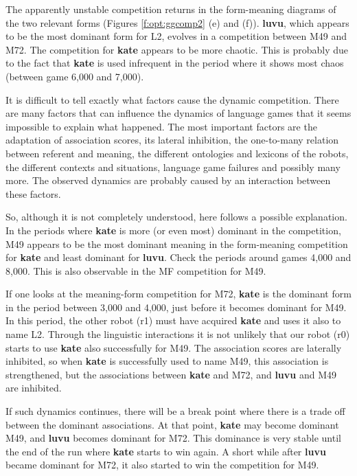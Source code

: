 The apparently unstable competition returns in the form-meaning diagrams of the two relevant forms (Figures \ref{f:opt:ggcomp2} (e) and (f)). {\bf luvu}, which appears to be the most dominant form for L2, evolves in a competition between M49 and M72. The competition for {\bf kate} appears to be more chaotic. This is probably due to the fact that {\bf kate} is used infrequent in the period where it shows most chaos (between game 6,000 and 7,000).

It is difficult to tell exactly what factors cause the dynamic competition. There are many factors that can influence the dynamics of language games that it seems impossible to explain what happened. The most important factors are the adaptation of association scores, its lateral inhibition, the one-to-many relation between referent and meaning, the different ontologies and lexicons of the robots, the different contexts and situations, language game failures and possibly many more. The observed dynamics are probably caused by an interaction between these factors.


So, although it is not completely understood, here follows a possible explanation. In the periods where {\bf kate} is more (or even most) dominant in the competition, M49 appears to be the most dominant meaning in the form-meaning competition for {\bf kate} and least dominant for {\bf luvu}. Check the periods around games 4,000 and 8,000. This is also observable in the MF competition for M49.

If one looks at the meaning-form competition for M72, {\bf kate} is the dominant form in the period between 3,000 and 4,000, just before it becomes dominant for M49. In this period, the other robot (r1) must have acquired {\bf kate} and uses it also to name L2. Through the linguistic interactions it is not unlikely that our robot (r0) starts to use {\bf kate} also successfully for M49. The association scores are laterally inhibited, so when {\bf kate} is successfully used to name M49, this association is strengthened, but the associations between {\bf kate} and M72, and {\bf luvu} and M49 are inhibited.

If such dynamics continues, there will be a break point where there is a trade off between the dominant associations. At that point, {\bf kate} may become dominant M49, and {\bf luvu} becomes dominant for M72. This dominance is very stable until the end of the run where {\bf kate} starts to win again. A short while after {\bf luvu} became dominant for M72, it also started to win the competition for M49.

